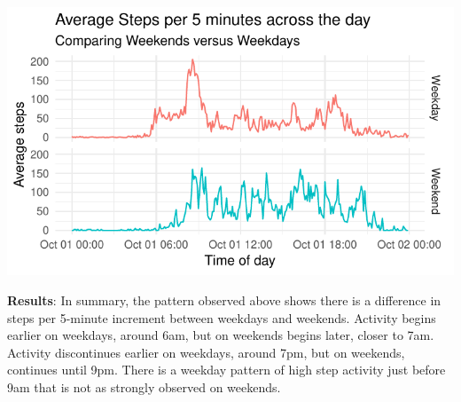 \documentclass[]{article}
\begin{document}
\includegraphics{PA1_template_files/figure-latex/plot imputed weekdayweekend steps-1.pdf}

\textbf{Results}: In summary, the pattern observed above shows there is
a difference in steps per 5-minute increment between weekdays and
weekends. Activity begins earlier on weekdays, around 6am, but on
weekends begins later, closer to 7am. Activity discontinues earlier on
weekdays, around 7pm, but on weekends, continues until 9pm. There is a
weekday pattern of high step activity just before 9am that is not as
strongly observed on weekends.
\end{document}
